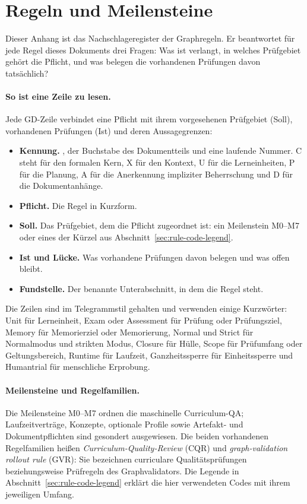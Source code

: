 \section{Regeln und Meilensteine}
\label{sec:rule-milestones}
Dieser Anhang ist das Nachschlageregister der Graphregeln. Er beantwortet
für jede Regel dieses Dokuments drei Fragen: Was ist verlangt, in welches
Prüfgebiet gehört die Pflicht, und was belegen die vorhandenen Prüfungen
davon tatsächlich?

\paragraph{So ist eine Zeile zu lesen.}
Jede GD-Zeile verbindet eine Pflicht mit ihrem vorgesehenen Prüfgebiet (Soll), vorhandenen Prüfungen (Ist) und deren Aussagegrenzen:
\begin{itemize}
\item \textbf{Kennung.} , der Buchstabe des Dokumentteils und eine laufende Nummer. C steht für den formalen Kern, X für den Kontext, U für die Lerneinheiten, P für die Planung, A für die Anerkennung impliziter Beherrschung und D für die Dokumentanhänge.
\item \textbf{Pflicht.} Die Regel in Kurzform.
\item \textbf{Soll.} Das Prüfgebiet, dem die Pflicht zugeordnet ist: ein Meilenstein M0--M7 oder eines der Kürzel aus Abschnitt~\ref{sec:rule-code-legend}.
\item \textbf{Ist und Lücke.} Was vorhandene Prüfungen davon belegen und was offen bleibt.
\item \textbf{Fundstelle.} Der benannte Unterabschnitt, in dem die Regel steht.
\end{itemize}
Die Zeilen sind im Telegrammstil gehalten und verwenden einige Kurzwörter: Unit für Lerneinheit, Exam oder Assessment für Prüfung oder Prüfungsziel, Memory für Memorierziel oder Memorierung, Normal und Strict für Normalmodus und strikten Modus, Closure für Hülle, Scope für Prüfumfang oder Geltungsbereich, Runtime für Laufzeit, Ganzheitssperre für Einheitssperre und Humantrial für menschliche Erprobung.

\paragraph{Meilensteine und Regelfamilien.}
Die Meilensteine M0--M7 ordnen die maschinelle Curriculum-QA; Laufzeitverträge, Konzepte, optionale Profile sowie Artefakt- und Dokumentpflichten sind gesondert ausgewiesen. Die beiden vorhandenen Regelfamilien heißen \emph{Curriculum-Quality-Review} (CQR) und \emph{graph-validation rollout rule} (GVR): Sie bezeichnen curriculare Qualitätsprüfungen beziehungsweise Prüfregeln des Graphvalidators. Die Legende in Abschnitt~\ref{sec:rule-code-legend} erklärt die hier verwendeten Codes mit ihrem jeweiligen Umfang.

